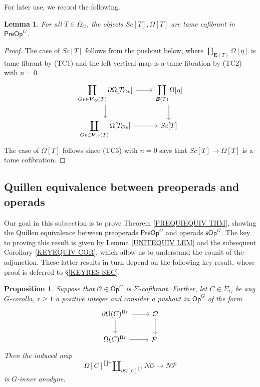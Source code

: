 \documentclass[a4paper,10pt
,draft
]{article}%
\numberwithin{equation}{section}
\numberwithin{figure}{section}
\newtheorem{lemma}[equation]{Lemma}%
\newtheorem{proposition}[equation]{Proposition}%
\theoremstyle{definition} %
\newcommand{\1}{\ensuremath{\mathbbm 1}}%
\begin{document}
For later use, we record the following.

\begin{lemma}\label{OMEGATTAME_LEM}
	For all $T \in \Omega_G$, the objects $Sc[T],\Omega[T]$ are tame cofibrant in $\mathsf{PreOp}^G$.
\end{lemma}

\begin{proof}
	The case of $Sc[T]$ follows from the pushout below, 
	where $\coprod_{\boldsymbol{E}(T)}\Omega[\eta]$
	is tame fibrant by (TC1) and the left vertical map is 
	a tame fibration by (TC2) with $n=0$.
	\[
	\begin{tikzcd}
	\displaystyle{
		\coprod_{Gv \in \boldsymbol{V}_G(T)} \partial\Omega[T_{Gv}]
	}
	\arrow[d] \arrow[r]
	&
	\displaystyle{
		\coprod_{\boldsymbol{E}(T)} \Omega[\eta]
	}
	\arrow[d]
	\\
	\displaystyle{
		\coprod_{Gv \in \boldsymbol{V}_G(T)} \Omega[T_{Gv}]
	}
	\arrow[r]
	&
	Sc[T]
	\end{tikzcd}
	\]
	The case of $\Omega[T]$
	follows since (TC3) with $n=0$
	says that $Sc[T] \to \Omega[T]$ is a tame cofibration.
\end{proof}




\subsection{Quillen equivalence between preoperads and operads}


Our goal in this subsection is to prove
Theorem \ref{PREQUIEQUIV THM},
showing the Quillen equivalence between
preoperads $\mathsf{PreOp}^G$
and operads $\mathsf{sOp}^G$.
The key to proving this result is given by 
Lemma \ref{UNITEQUIV LEM}
and the subsequent
Corollary \ref{KEYEQUIV COR},
which allow us to understand the counit of the adjunction.
These latter results in turn depend on the following key 
result, whose proof is deferred to \S \ref{KEYRES SEC}.


\begin{proposition}\label{KEYPRVAR PROP}
	Suppose that $\mathcal{O} \in \mathsf{Op}^{G}$
	is $\Sigma$-cofibrant.
	Further, let $C \in \Sigma_G$ be any $G$-corolla,
	$r \geq 1$ a positive integer and consider 
	a pushout in $\mathsf{Op}^{G}$ of the form
\begin{equation}\label{PUSHOUTPROPVAR EQ}
	\begin{tikzcd}
	\partial \Omega(C)^{\amalg r} \ar{r} \ar{d} 
	& \mathcal{O} \ar{d}
\\
	\Omega(C)^{\amalg r} \ar{r} & \mathcal{P}.
	\end{tikzcd}
\end{equation}
	Then the induced map
\begin{equation}\label{ANODYNEVAR EQ}
	\Omega[C]^{\amalg r} 
	\amalg_{\partial \Omega[C]^{\amalg r}} N\mathcal{O} \to N\mathcal{P}
\end{equation}
	is $G$-inner anodyne.
\end{proposition}
\end{document}
